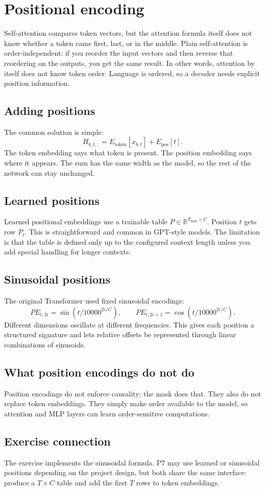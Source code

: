 \section{Positional encoding}\label{sec:11}

Self-attention compares token vectors, but the attention formula itself does
not know whether a token came first, last, or in the middle. Plain self-attention is
order-independent: if you reorder the input vectors and then reverse that
reordering on the outputs, you get the same result. In other words, attention by
itself does not know token order. Language is ordered, so a decoder needs
explicit position information.

\subsection*{Adding positions}
The common solution is simple:
\[
  H_{b,t,:} = E_{\text{token}}[x_{b,t}] + E_{\text{pos}}[t].
\]
The token embedding says what token is present. The position embedding says
where it appears. The sum has the same width as the model, so the rest of the
network can stay unchanged.

\subsection*{Learned positions}
Learned positional embeddings use a trainable table
$P \in \mathbb{R}^{T_{\max} \times C}$. Position $t$ gets row $P_t$. This is
straightforward and common in GPT-style models. The limitation is that the table
is defined only up to the configured context length unless you add special
handling for longer contexts.

\subsection*{Sinusoidal positions}
The original Transformer used fixed sinusoidal encodings:
\[
  PE_{t,2i} = \sin\left(t / 10000^{2i/C}\right),
  \qquad
  PE_{t,2i+1} = \cos\left(t / 10000^{2i/C}\right).
\]
Different dimensions oscillate at different frequencies. This gives each
position a structured signature and lets relative offsets be represented through
linear combinations of sinusoids.

\subsection*{What position encodings do not do}
Position encodings do not enforce causality; the mask does that. They also do
not replace token embeddings. They simply make order available to the model, so
attention and MLP layers can learn order-sensitive computations.

\subsection*{Exercise connection}
The exercise implements the sinusoidal formula. P7 may use learned or sinusoidal
positions depending on the project design, but both share the same interface:
produce a $T \times C$ table and add the first $T$ rows to token embeddings.

